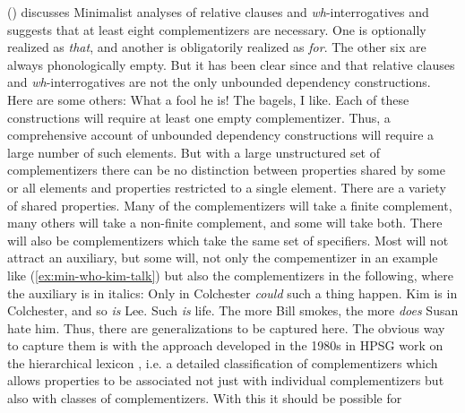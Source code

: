 \documentclass[output=paper]{langsci/langscibook}
\begin{document}
\citeauthor{Borsley2006a} (\citeyear*{Borsley2006a,Borsley.2017})
discusses Minimalist analyses of relative clauses and \emph{wh}-interrogatives and suggests that at least eight complementizers are necessary. One is optionally realized as \emph{that}, and another is obligatorily realized as \emph{for}. The other six are always phonologically empty. But it has been clear since \citet{Ross67} and \citet{Chomsky77a-u} that relative clauses and \emph{wh}-interrogatives are not the only unbounded dependency constructions. Here are some others:
\eal
\settowidth{}
\ex What a fool he is!                          
\ex The bagels, I like.	                        
\zl 
Each of these constructions will require at least one empty complementizer. Thus, a comprehensive
account of unbounded dependency constructions will require a large number of such elements. 
But with a large unstructured set of complementizers there can be no distinction between properties
shared by some or all elements and properties restricted to a single element. There are a variety of shared properties. Many of the
complementizers will take a finite complement, many others will take a non-finite complement, and
some will take both. There will also be complementizers which take the same set of specifiers. Most
will not attract an auxiliary, but some will, not only the compementizer in an example like
(\ref{ex:min-who-kim-talk}) but also the complementizers in the following, where the auxiliary is in
italics: 
\eal
\ex Only in Colchester \emph{could} such a thing happen.
\ex Kim is in Colchester, and so \emph{is} Lee.
\ex Such \emph{is} life.
\ex The more Bill smokes, the more \emph{does} Susan hate him.
\zl
Thus, there are generalizations to be captured here. The obvious way to capture them is with the
approach developed in the 1980s in HPSG work on the hierarchical lexicon \citep*{FPW85a,Flickinger87}, i.e. a detailed
classification of complementizers which allows properties to be associated not just with individual
complementizers but also with classes of complementizers. With this it should be possible for
\end{document}
